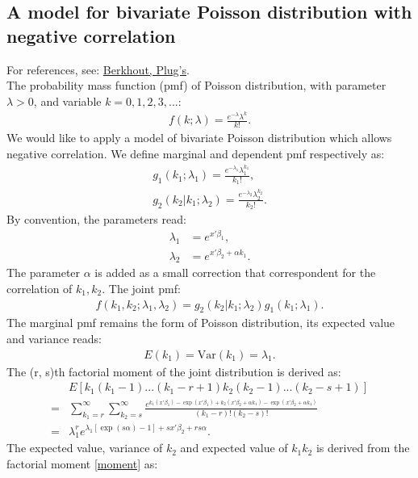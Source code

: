 \documentclass[submission, Phys]{SciPost}
\begin{document}
\begin{appendix}
\subsection{A model for bivariate Poisson distribution with negative correlation}
For references, see: \hyperlink{http://www.economists.nl/files/20130411-SN2004.pdf}{Berkhout, Plug's}.\\
The probability mass function (pmf) of Poisson distribution, with parameter $\lambda>0$, and variable $k = 0,1,2,3, ...$:
\begin{align}
f(k; \lambda)= \frac{e^{-\lambda}\lambda^k}{k!}.
\end{align}
We would like to apply a model of bivariate Poisson distribution which allows negative correlation. We define marginal and dependent pmf respectively as:
\begin{align}
g_{1}(k_{1};\lambda_1)=\frac{e^{-\lambda_{1}}\lambda_{1}^{k_{1}}}{k_{1}!},\\g_{2}(k_{2}|k_{1};\lambda_2)=\frac{e^{-\lambda_{2}}\lambda_{2}^{k_{2}}}{k_{2}!}.
\end{align}
By convention, the parameters read:
\begin{align}
\lambda_1&= e^{x'\beta_1},\\\lambda_2&=e^{x'\beta_2+\alpha k_1}.
\end{align}
The parameter $\alpha$ is added as a small correction that correspondent for the correlation of $k_1,k_2$. The joint pmf:
\begin{align}
f(k_1,k_2;\lambda_1,\lambda_2)=g_2(k_2|k_1;\lambda_2)g_1(k_1;\lambda_1). 
\end{align}
The marginal pmf remains the form of Poisson distribution, its expected value and variance reads:
\begin{align}
E(k_1)=\text{Var}(k_1)=\lambda_1.
\end{align}
The (r, s)th factorial moment of the joint distribution is derived as:
\begin{align}
&E\left[k_1(k_1-1)...(k_1-r+1)k_2(k_2-1)...(k_2-s+1)\right]\\=&\sum^{\infty}_{k_1=r}\sum^{\infty}_{k_2=s}\frac{e^{k_1(x'\beta_1)-\exp(x'\beta_1)+k_2(x'\beta_2+\alpha k_1)-\exp(x'\beta_2+\alpha k_1)}}{(k_1-r)!(k_2-s)!}\\=&\lambda_1^re^{\lambda_1[\exp(s\alpha)-1]+sx'\beta_2+rs\alpha}.\label{moment}
\end{align}
The expected value, variance of $k_2$ and expected value of $k_1k_2$ is derived from the factorial moment \ref{moment} as:
\begin{align}

\end{align}
\end{appendix}
\end{document}
